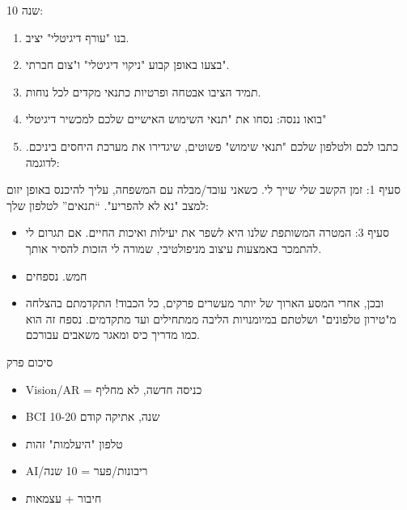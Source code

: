 
10 שנה:

\begin{enumerate}
  \item בנו "עורף דיגיטלי" יציב.
  \item בצעו באופן קבוע "ניקוי דיגיטלי" ו"צום חברתי".
  \item תמיד הציבו אבטחה ופרטיות כתנאי מקדים לכל נוחות.
  \item בואו ננסה: נסחו את "תנאי השימוש האישיים שלכם למכשיר דיגיטלי"
  \item כתבו לכם ולטלפון שלכם "תנאי שימוש" פשוטים, שיגדירו את מערכת היחסים ביניכם. לדוגמה:
\end{enumerate}

\begin{tcbpractice}{סעיף 1: זמן הקשב שלי שייך לי. כשאני עובד/מבלה עם המשפחה, עליך להיכנס באופן יזום למצב "נא לא להפריע".}
“תנאים” לטלפון שלך:

\begin{itemize}
  \item סעיף 3: המטרה המשותפת שלנו היא לשפר את יעילות ואיכות החיים. אם תגרום לי להתמכר באמצעות עיצוב מניפולטיבי, שמורה לי הזכות להסיר אותך.
  \item חמש. נספחים
  \item ובכן, אחרי המסע הארוך של יותר מעשרים פרקים, כל הכבוד! התקדמתם בהצלחה מ"טירון טלפונים" ושלטתם במיומנויות הליבה ממתחילים ועד מתקדמים. נספח זה הוא כמו מדריך כיס ומאגר משאבים עבורכם.
\end{itemize}

\end{tcbpractice}

\begin{tcbsummary}{סיכום פרק}
\begin{itemize}
  \item Vision/AR = כניסה חדשה, לא מחליף
  \item BCI 10-20 שנה, אתיקה קודם
  \item טלפון "היעלמות" זהות
  \item AI/ריבונות/פער = 10 שנה
  \item חיבור + עצמאות
\end{itemize}

\end{tcbsummary}
